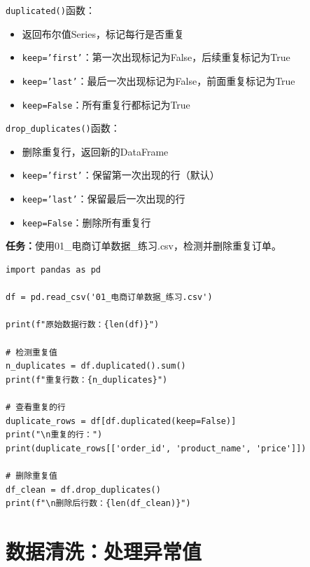 \documentclass[12pt,a4paper]{article}
\begin{document}
\begin{knowledgebox}
\texttt{duplicated()}函数：
\begin{itemize}
    \item 返回布尔值Series，标记每行是否重复
    \item \texttt{keep='first'}：第一次出现标记为False，后续重复标记为True
    \item \texttt{keep='last'}：最后一次出现标记为False，前面重复标记为True
    \item \texttt{keep=False}：所有重复行都标记为True
\end{itemize}

\texttt{drop\_duplicates()}函数：
\begin{itemize}
    \item 删除重复行，返回新的DataFrame
    \item \texttt{keep='first'}：保留第一次出现的行（默认）
    \item \texttt{keep='last'}：保留最后一次出现的行
    \item \texttt{keep=False}：删除所有重复行
\end{itemize}
\end{knowledgebox}

\begin{practicebox}
\textbf{任务：}使用01\_电商订单数据\_练习.csv，检测并删除重复订单。

\begin{lstlisting}
import pandas as pd

df = pd.read_csv('01_电商订单数据_练习.csv')

print(f"原始数据行数：{len(df)}")

# 检测重复值
n_duplicates = df.duplicated().sum()
print(f"重复行数：{n_duplicates}")

# 查看重复的行
duplicate_rows = df[df.duplicated(keep=False)]
print("\n重复的行：")
print(duplicate_rows[['order_id', 'product_name', 'price']])

# 删除重复值
df_clean = df.drop_duplicates()
print(f"\n删除后行数：{len(df_clean)}")
\end{lstlisting}
\end{practicebox}

\section{数据清洗：处理异常值}
\end{document}
